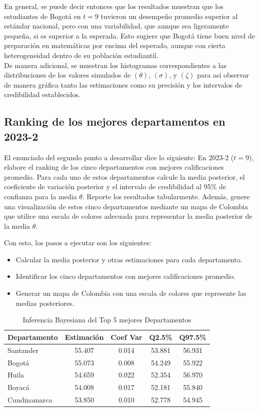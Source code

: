 \documentclass[12pt]{article}
\begin{document}
En general, se puede decir entonces que los resultados muestran que los estudiantes de Bogotá en $t=9$ tuvieron un desempeño promedio superior al estándar nacional, pero con una variabilidad, que aunque sea ligeramente pequeña, si es superior a la esperada. Esto sugiere que Bogotá tiene buen nivel de preparación en matemáticas por encima del esperado, aunque con cierta heterogeneidad dentro de su población estudiantil.\\

De manera adicional, se muestran los histogramas correspondientes a las distribuciones de los valores simulados de $(\theta)$, $(\sigma)$, y $(\zeta)$ para así observar de manera gráfica tanto las estimaciones como su precisión y los intervalos de credibilidad establecidos.\\


\subsection{Ranking de los mejores departamentos en 2023-2}

El enunciado del segundo punto a desarrollar dice lo siguiente: En 2023-2 ($t=9$), elabore el ranking de los cinco departamentos con mejores calificaciones promedio. Para cada uno de estos departamentos calcule la media posterior, el coeficiente de variación posterior y el intervalo de credibilidad al 95$\%$ de confianza para la media $\theta$. Reporte los resultados tabularmente. Además, genere una visualización de estos cinco departamentos mediante un mapa de Colombia que utilice una escala de colores adecuada para representar la media posterior de la media $\theta$.

Con esto, los pasos a ejecutar son los siguientes:

\begin{itemize}
    \item   Calcular la media posterior y otras estimaciones para cada departamento.
    \item  Identificar los cinco departamentos con mejores calificaciones promedio.
    \item  Generar un mapa de Colombia con una escala de colores que represente las medias posteriores.
\end{itemize}

\begin{table}[H]
\centering
\begin{tabular}{lcccc}
\hline
\textbf{Departamento} & \textbf{Estimación} & \textbf{Coef Var} & \textbf{Q2.5\%} & \textbf{Q97.5\%} \\
\hline
Santander & 55.407 & 0.014 & 53.881 & 56.931 \\
Bogotá & 55.073 & 0.008 & 54.249 & 55.922 \\
Huila & 54.659 & 0.022 & 52.354 & 56.970 \\
Boyacá & 54.008 & 0.017 & 52.181 & 55.840 \\
Cundinamarca & 53.850 & 0.010 & 52.778 & 54.945 \\
\hline
\end{tabular}
\caption{Inferencia Bayesiana del Top 5 mejores Departamentos}
\label{tab:top-departamentos}
\end{table}
\end{document}
